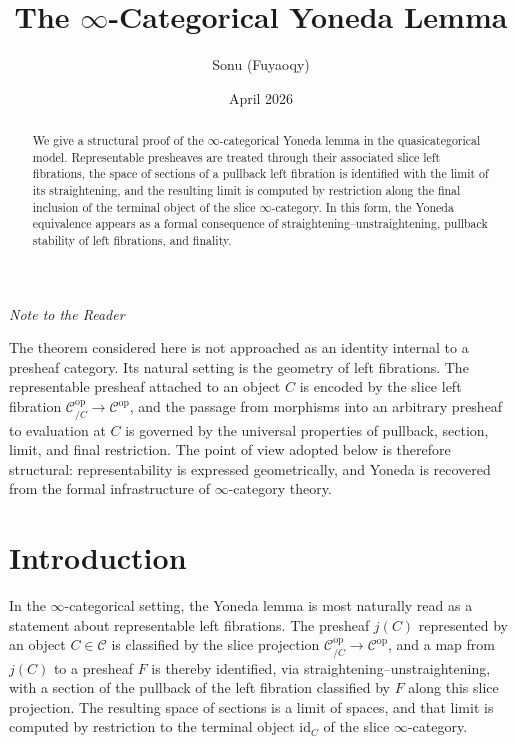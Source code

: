 \documentclass[11pt]{article}
\title{The $\infty$-Categorical Yoneda Lemma}
\author{Sonu (Fuyaoqy)}
\date{April 2026}
\theoremstyle{definition}
\newcommand{\C}{\mathcal{C}}
\newcommand{\id}{\mathrm{id}}
\newcommand{\op}{\mathrm{op}}
\begin{document}
\maketitle
\thispagestyle{empty}

\begin{abstract}
We give a structural proof of the $\infty$-categorical Yoneda lemma in the
quasicategorical model. Representable presheaves are treated through their
associated slice left fibrations, the space of sections of a pullback left
fibration is identified with the limit of its straightening, and the resulting
limit is computed by restriction along the final inclusion of the terminal object
of the slice $\infty$-category. In this form, the Yoneda equivalence appears as a
formal consequence of straightening--unstraightening, pullback stability of left
fibrations, and finality.
\end{abstract}

\begin{center}
\emph{Note to the Reader}
\end{center}

The theorem considered here is not approached as an identity internal to a
presheaf category. Its natural setting is the geometry of left fibrations. The
representable presheaf attached to an object $C$ is encoded by the slice left
fibration $\C^{\op}_{/C} \to \C^{\op}$, and the passage from morphisms into an
arbitrary presheaf to evaluation at $C$ is governed by the universal properties
of pullback, section, limit, and final restriction. The point of view adopted
below is therefore structural: representability is expressed geometrically, and
Yoneda is recovered from the formal infrastructure of $\infty$-category theory.

\section{Introduction}

In the $\infty$-categorical setting, the Yoneda lemma is most naturally read as a
statement about representable left fibrations. The presheaf $j(C)$ represented by
an object $C \in \C$ is classified by the slice projection
$\C^{\op}_{/C} \to \C^{\op}$, and a map from $j(C)$ to a presheaf $F$ is thereby
identified, via straightening--unstraightening, with a section of the pullback of
the left fibration classified by $F$ along this slice projection. The resulting
space of sections is a limit of spaces, and that limit is computed by restriction
to the terminal object $\id_C$ of the slice $\infty$-category.
\end{document}
